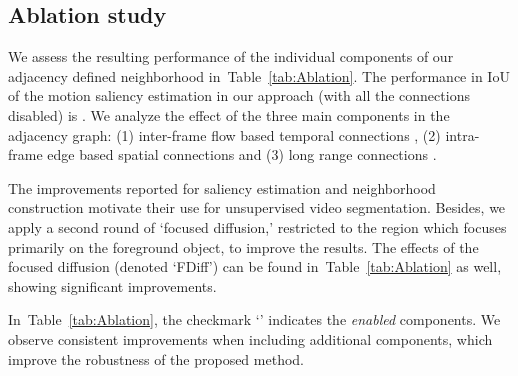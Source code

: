 \documentclass[runningheads]{llncs}
\newcommand{\tabref}[1]{Table~\ref{#1}}
\begin{document}
\subsection{Ablation study}




We assess the resulting performance of the individual components of our adjacency defined neighborhood in~\tabref{tab:Ablation}. The performance in IoU of the motion saliency estimation in our approach (with all the connections disabled) is . We analyze the effect of the three main components in the adjacency graph: (1) inter-frame flow based temporal connections , (2) intra-frame edge based spatial connections  and (3) long range connections .



The improvements reported for saliency estimation and neighborhood construction motivate their use for unsupervised video segmentation. Besides, we  apply a second round of `focused diffusion,' restricted to the region which focuses primarily on the foreground object, to improve the results. The effects of the focused diffusion (denoted `FDiff') can be found in~\tabref{tab:Ablation} as well, showing significant improvements.

In~\tabref{tab:Ablation}, the checkmark `\checkmark' indicates the {\emph{enabled}} components. We observe consistent improvements when including additional components, which improve the robustness of the proposed method. 
\end{document}
